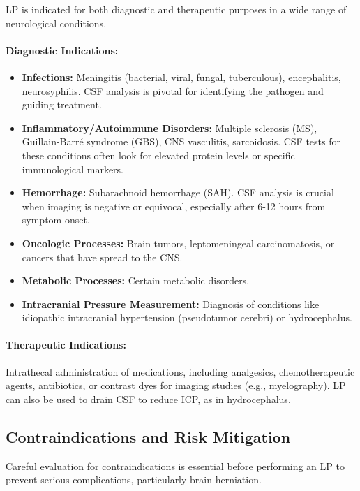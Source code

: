 LP is indicated for both diagnostic and therapeutic purposes in a wide range of neurological conditions.
	
\paragraph{Diagnostic Indications:}
	\begin{itemize}
		\item \textbf{Infections:} Meningitis (bacterial, viral, fungal, tuberculous), encephalitis, neurosyphilis. CSF analysis is pivotal for identifying the pathogen and guiding treatment.
		\item \textbf{Inflammatory/Autoimmune Disorders:} Multiple sclerosis (MS), Guillain-Barré syndrome (GBS), CNS vasculitis, sarcoidosis. CSF tests for these conditions often look for elevated protein levels or specific immunological markers.
		\item \textbf{Hemorrhage:} Subarachnoid hemorrhage (SAH). CSF analysis is crucial when imaging is negative or equivocal, especially after 6-12 hours from symptom onset.
		\item \textbf{Oncologic Processes:} Brain tumors, leptomeningeal carcinomatosis, or cancers that have spread to the CNS.
		\item \textbf{Metabolic Processes:} Certain metabolic disorders.
		\item \textbf{Intracranial Pressure Measurement:} Diagnosis of conditions like idiopathic intracranial hypertension (pseudotumor cerebri) or hydrocephalus.
	\end{itemize}
	
\paragraph{Therapeutic Indications:} Intrathecal administration of medications, including analgesics, chemotherapeutic agents, antibiotics, or contrast dyes for imaging studies (e.g., myelography). LP can also be used to drain CSF to reduce ICP, as in hydrocephalus.
	
\subsection{Contraindications and Risk Mitigation}
	
Careful evaluation for contraindications is essential before performing an LP to prevent serious complications, particularly brain herniation.
	
